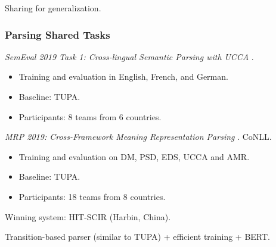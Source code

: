 \documentclass[t,xcolor={svgnames,table}]{beamer}
\begin{document}
\begin{frame}
    \vfill
    
    Sharing for generalization.
    
    \vspace{-2mm}
    
    \begin{center}
    \end{center}
\end{frame}



\begin{frame}
\frametitle{Parsing Shared Tasks}
\textit{SemEval 2019 Task 1: Cross-lingual Semantic Parsing with UCCA}
\citep*{hershcovich2019shared}.
\begin{itemize}
\item Training and evaluation in English, French, and German.
\item Baseline: TUPA.
\item Participants: 8 teams from 6 countries.
\end{itemize}

\pause
\vfill

\textit{MRP 2019: Cross-Framework Meaning Representation Parsing}
\citep*{Oep:Abe:Haj:19}. CoNLL.
\begin{itemize}
\item Training and evaluation on DM, PSD, EDS, UCCA and AMR.
\item Baseline: TUPA.
\item Participants: 18 teams from 8 countries.
\end{itemize}

\pause
\vfill

Winning system: HIT-SCIR (Harbin, China).

Transition-based parser (similar to TUPA) + efficient training + BERT.
\end{frame}
\end{document}
